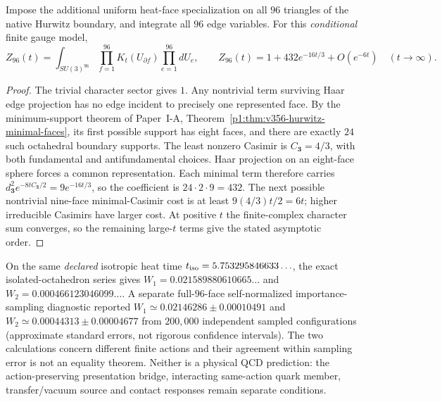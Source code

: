\documentclass[12pt,a4paper]{article}
\begin{document}
\begin{proposition}
\label{p11:prop:v356-full-hurwitz-character-leading}
Impose the additional uniform heat-face specialization on all
$96$ triangles of the native Hurwitz boundary, and integrate all
$96$ edge variables.  For this \emph{conditional} finite gauge model,
\[
 Z_{96}(t)=\int_{SU(3)^{96}}\prod_{f=1}^{96}
   K_t(U_{\partial f})\prod_{e=1}^{96}dU_e,
\qquad
 \boxed{Z_{96}(t)=1+432e^{-16t/3}+O(e^{-6t})}\quad(t\to\infty).
\]
\end{proposition}
\begin{proof}
The trivial character sector gives $1$.  Any nontrivial term
surviving Haar edge projection has no edge incident to precisely
one represented face.  By the minimum-support theorem of
Paper~I-A, Theorem~\ref{p1:thm:v356-hurwitz-minimal-faces},
its first possible support has eight faces, and there are exactly
$24$ such octahedral boundary supports.  The least nonzero Casimir
is $C_{\mathbf3}=4/3$, with both fundamental and antifundamental
choices.  Haar projection on an eight-face sphere forces a common
representation.  Each minimal term therefore carries
$d_{\mathbf3}^2e^{-8tC_{\mathbf3}/2}=9e^{-16t/3}$,
so the coefficient is $24\cdot2\cdot9=432$.
The next possible nontrivial nine-face minimal-Casimir cost is at
least $9(4/3)t/2=6t$; higher irreducible Casimirs have larger
cost.  At positive $t$ the finite-complex character sum converges,
so the remaining large-$t$ terms give the stated asymptotic order.
\end{proof}

\begin{remark}
\label{p11:rem:v356-closed-shell-status}
On the same \emph{declared} isotropic heat time
$t_{\rm iso}=5.753295846633\ldots$, the exact isolated-octahedron
series gives $W_1=0.021589880610665\ldots$ and
$W_2=0.000466123046099\ldots$.  A separate full-$96$-face
self-normalized importance-sampling diagnostic reported
$W_1\simeq0.02146286\pm0.00010491$ and
$W_2\simeq0.00044313\pm0.00004677$ from $200{,}000$
independent sampled configurations (approximate standard errors,
not rigorous confidence intervals).  The two calculations concern
different finite actions and their agreement within sampling
error is not an equality theorem.  Neither is a physical QCD
prediction: the action-preserving presentation bridge, interacting
same-action quark member, transfer/vacuum source and contact
responses remain separate conditions.
\end{remark}
\end{document}

